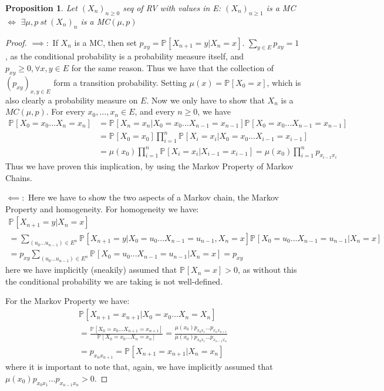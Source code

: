 \documentclass[12pt]{book}
\renewcommand{\iff}{\Leftrightarrow}
\newtheorem{prop}[theorem]{Proposition}
\theoremstyle{definition}
\theoremstyle{remark}
\begin{document}
\begin{prop}
	Let $(X_n)_{n \geq 0}$ seq of RV with values in E:
	$(X_n)_{n \geq 1}$ is a MC $\iff$ $\exists \mu, p\ st\ (X_n)_n$ is a MC$(\mu, p)$
\end{prop}
\begin{proof}
	$\implies:$ If $X_n$ is a MC, then set $p_{xy}=\mathbb{P}_{} \left[ X_{n+1}=y | X_{n}=x \right] $. $\sum_{y \in E}^{} p_{xy}=1$, as the conditional probability is a probability measure itself, and $p_{xy}\geq 0, \forall x, y \in E$ for the same reason. Thus we have that the collection of $(p_{xy})_{x,y \in E}$ form a transition probability. Setting $\mu(x) = \mathbb{P}_{} \left[ X_0 =x \right] $, which is also clearly a probability measure on $E$. Now we only have to show that $X_{n} $ is a $MC(\mu, p)$. For every $x_0,\ldots , x_n \in E$, and every $n\geq 0$, we have
\begin{align}
	\mathbb{P}_{} \left[ X_0=x_0...X_n=x_n \right]  
	&= \mathbb{P}_{} \left[ X_n = x_n | X_0=x_0 ... X_{n-1}=x_{n-1} \right] \mathbb{P}_{} \left[ X_0=x_0 ... X_{n-1}=x_{n-1} \right] \\
	&= \mathbb{P}_{} \left[ X_0 = x_0 \right] \prod_{i=1}^{n} \mathbb{P}_{} \left[ X_i = x_i | X_0=x_0... X_{i-1}=x_{i-1} \right] \\
	&= \mu(x_0) \prod_{i=1}^n \mathbb{P}_{} \left[ X_i = x_i | X_{i-1} = x_{i-1}  \right] = \mu(x_0) \prod_{i=1}^n p_{x_{i-1}x_{i}} 
\end{align}
Thus we have proven this implication, by using the Markov Property of Markov Chains.

$\impliedby:$ Here we have to show the two aspects of a Markov chain, the Markov Property and homogeneity. For homogeneity we have:
\begin{gather}
	\mathbb{P}_{} \left[ X_{n+1} = y | X_n =x \right] \\
	= \sum_{(u_0...u_{n-1}) \in E^n}^{} \mathbb{P}_{} \left[ X_{n+1}=y | X_0=u_0...X_{n-1}=u_{n-1}, X_n =x \right] \mathbb{P}_{} \left[ X_0=u_0... X_{n-1}=u_{n-1} | X_n = x \right] \\
	= p_{xy} \sum_{(u_0...u_{n-1})\in E^n}^{} \mathbb{P}_{} \left[ X_0=u_0...X_{n-1}=u_{n-1} | X_n = x \right] = p_{xy}
\end{gather}
here we have implicitly (sneakily) assumed that $\mathbb{P}_{} \left[ X_n = x \right] > 0$, as without this the conditional probability we are taking is not well-defined.

For the Markov Property we have:
\begin{align}
	\mathbb{P}_{} \left[ X_{n+1}=x_{n+1} | X_0=x_0...X_n=X_n \right] \\
	=\frac{\mathbb{P}_{} \left[ X_0=x_0... X_{n+1}=x_{n+1} \right] } {\mathbb{P}_{} \left[ X_0=x_0 ... X_{n}=x_{n} \right]} = \frac{\mu(x_0)p_{x_0x_1} ... p_{x_{n}x_{n+1}}} {\mu(x_0)p_{x_0x_1}...p_{x_{n-1}x_{n}}} \\
	= p_{x_nx_{n+1}} = \mathbb{P}_{} \left[ X_{n+1} = x_{n+1} | X_n=x_n \right] 
\end{align}
where it is important to note that, again,  we have implicitly assumed that \newline $\mu(x_0)p_{x_0x_1}...p_{x_{n-1}x_n}>0$. 

\end{proof}
\end{document}
